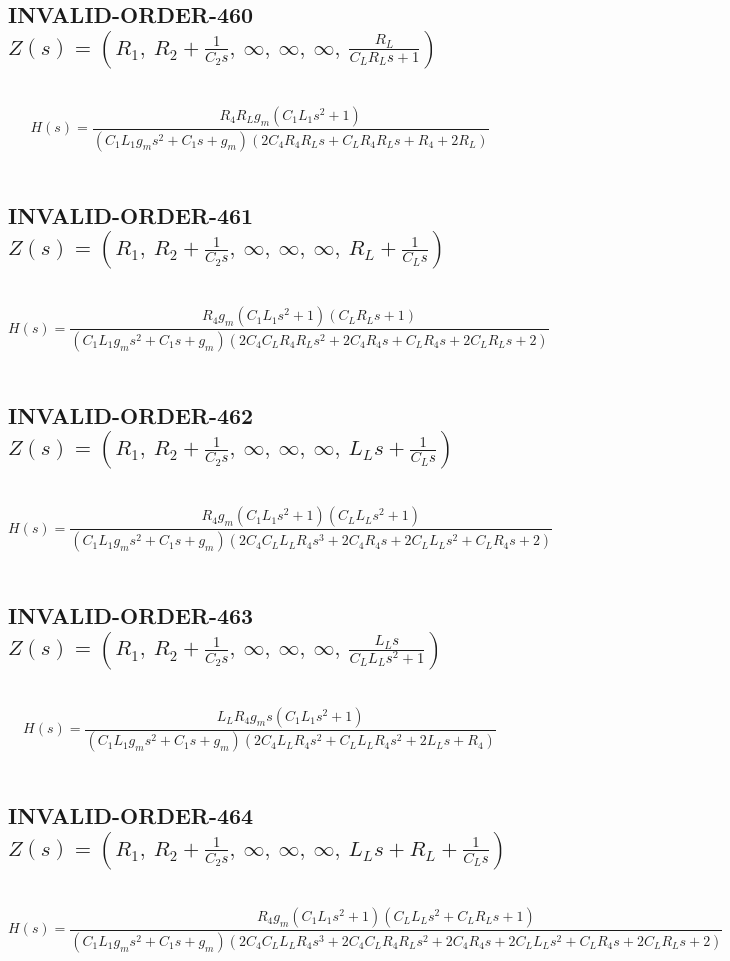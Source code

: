 \documentclass{article}
\begin{document}
\subsection{INVALID-ORDER-460 $Z(s) = \left( R_{1}, \  R_{2} + \frac{1}{C_{2} s}, \  \infty, \  \infty, \  \infty, \  \frac{R_{L}}{C_{L} R_{L} s + 1}\right)$ } \ 
\textbf{\[H(s) = \frac{R_{4} R_{L} g_{m} \left(C_{1} L_{1} s^{2} + 1\right)}{\left(C_{1} L_{1} g_{m} s^{2} + C_{1} s + g_{m}\right) \left(2 C_{4} R_{4} R_{L} s + C_{L} R_{4} R_{L} s + R_{4} + 2 R_{L}\right)}\] } \ 
\subsection{INVALID-ORDER-461 $Z(s) = \left( R_{1}, \  R_{2} + \frac{1}{C_{2} s}, \  \infty, \  \infty, \  \infty, \  R_{L} + \frac{1}{C_{L} s}\right)$ } \ 
\textbf{\[H(s) = \frac{R_{4} g_{m} \left(C_{1} L_{1} s^{2} + 1\right) \left(C_{L} R_{L} s + 1\right)}{\left(C_{1} L_{1} g_{m} s^{2} + C_{1} s + g_{m}\right) \left(2 C_{4} C_{L} R_{4} R_{L} s^{2} + 2 C_{4} R_{4} s + C_{L} R_{4} s + 2 C_{L} R_{L} s + 2\right)}\] } \ 
\subsection{INVALID-ORDER-462 $Z(s) = \left( R_{1}, \  R_{2} + \frac{1}{C_{2} s}, \  \infty, \  \infty, \  \infty, \  L_{L} s + \frac{1}{C_{L} s}\right)$ } \ 
\textbf{\[H(s) = \frac{R_{4} g_{m} \left(C_{1} L_{1} s^{2} + 1\right) \left(C_{L} L_{L} s^{2} + 1\right)}{\left(C_{1} L_{1} g_{m} s^{2} + C_{1} s + g_{m}\right) \left(2 C_{4} C_{L} L_{L} R_{4} s^{3} + 2 C_{4} R_{4} s + 2 C_{L} L_{L} s^{2} + C_{L} R_{4} s + 2\right)}\] } \ 
\subsection{INVALID-ORDER-463 $Z(s) = \left( R_{1}, \  R_{2} + \frac{1}{C_{2} s}, \  \infty, \  \infty, \  \infty, \  \frac{L_{L} s}{C_{L} L_{L} s^{2} + 1}\right)$ } \ 
\textbf{\[H(s) = \frac{L_{L} R_{4} g_{m} s \left(C_{1} L_{1} s^{2} + 1\right)}{\left(C_{1} L_{1} g_{m} s^{2} + C_{1} s + g_{m}\right) \left(2 C_{4} L_{L} R_{4} s^{2} + C_{L} L_{L} R_{4} s^{2} + 2 L_{L} s + R_{4}\right)}\] } \ 
\subsection{INVALID-ORDER-464 $Z(s) = \left( R_{1}, \  R_{2} + \frac{1}{C_{2} s}, \  \infty, \  \infty, \  \infty, \  L_{L} s + R_{L} + \frac{1}{C_{L} s}\right)$ } \ 
\textbf{\[H(s) = \frac{R_{4} g_{m} \left(C_{1} L_{1} s^{2} + 1\right) \left(C_{L} L_{L} s^{2} + C_{L} R_{L} s + 1\right)}{\left(C_{1} L_{1} g_{m} s^{2} + C_{1} s + g_{m}\right) \left(2 C_{4} C_{L} L_{L} R_{4} s^{3} + 2 C_{4} C_{L} R_{4} R_{L} s^{2} + 2 C_{4} R_{4} s + 2 C_{L} L_{L} s^{2} + C_{L} R_{4} s + 2 C_{L} R_{L} s + 2\right)}\] } \ 
\end{document}
